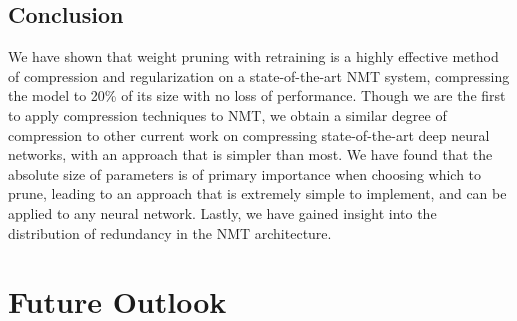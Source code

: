 \subsection{Conclusion}
\label{subsec:conclusion}
We have shown that weight pruning with retraining is a highly effective method of compression and regularization on a state-of-the-art NMT system, compressing the model to 20\% of its size with no loss of performance. 
Though we are the first to apply compression techniques to NMT, we obtain a similar degree of compression to other current work on compressing state-of-the-art deep neural networks, with an approach that is simpler than most.
We have found that the absolute size of parameters is of primary importance when choosing which to prune, leading to an approach that is extremely simple to implement, and can be applied to any neural network.
Lastly, we have gained insight into the distribution of redundancy in the NMT architecture.


\section{Future Outlook}

